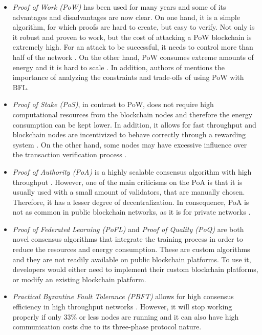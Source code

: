 \begin{itemize}
    \item \textit{Proof of Work (PoW)} has been used for many years and some of its advantages and disadvantages are now clear. On one hand, it is a simple algorithm, for which proofs are hard to create, but easy to verify. Not only is it robust and proven to work, but the cost of attacking a PoW blockchain is extremely high. For an attack to be successful, it needs to control more than half of the network \cite{li_blockchain_2021}. On the other hand, PoW consumes extreme amounts of energy and it is hard to scale \cite{edwood_2020, li_blockchain_2021, ccaf}. In addition, authors of \cite{10.48550/arxiv.2112.07938} mentions the importance of analyzing the constraints and trade-offs of using PoW with BFL.

    \item \textit{Proof of Stake (PoS)}, in contrast to PoW, does not require high computational resources from the blockchain nodes and therefore the energy consumption can be kept lower. In addition, it allows for fast throughput and blockchain nodes are incentivized to behave correctly through a rewarding system \cite{li_blockchain_2021}. On the other hand, some nodes may have excessive influence over the transaction verification process \cite{li_blockchain_2021}.
    
    \item \textit{Proof of Authority (PoA)} is a highly scalable consensus algorithm with high throughput \cite{binance_academy_2020}. However, one of the main criticisms on the PoA is that it is usually used with a small amount of validators, that are manually chosen. Therefore, it has a lesser degree of decentralization. In consequence, PoA is not as common in public blockchain networks, as it is for private networks \cite{bPoA}.

    \item \textit{Proof of Federated Learning (PoFL)} \cite{9347812, 10.48550/arxiv.2007.15145} and \textit{Proof of Quality (PoQ)} \cite{8843900} are both novel consensus algorithms that integrate the training process in order to reduce the resources and energy consumption. These are custom algorithms and they are not readily available on public blockchain platforms. To use it, developers would either need to implement their custom blockchain platforms, or modify an existing blockchain platform.

    \item \textit{Practical Byzantine Fault Tolerance (PBFT)} allows for high consensus efficiency in high throughput networks \cite{li_blockchain_2021}. However, it will stop working properly if only 33\% or less nodes are running and it can also have high communication costs due to its three-phase protocol nature.


\end{itemize}
